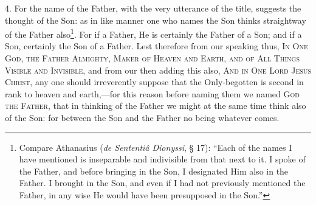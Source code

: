4. For the name of the Father, with the very utterance of the title, suggests the thought of the Son: as in like manner one who names the Son thinks straightway of the Father also\footnote{Compare Athanasius (\emph{de Sententiâ Dionyssi}, § 17): “Each of the names I have mentioned is inseparable and indivisible from that next to it. I spoke of the Father, and before bringing in the Son, I designated Him also in the Father. I brought in the Son, and even if I had not previously mentioned the Father, in any wise He would have been presupposed in the Son.”}. For if a Father, He is certainly the Father of a Son; and if a Son, certainly the Son of a Father. Lest therefore from our speaking thus, \textsc{In One God, the Father Almighty, Maker of Heaven and Earth, and of All Things Visible and Invisible}, and from our then adding this also, \textsc{And in One Lord Jesus Christ}, any one should irreverently suppose that the Only-begotten is second in rank to heaven and earth,—for this reason before naming them we named \textsc{God the Father}, that in thinking of the Father we might at the same time think also of the Son: for between the Son and the Father no being whatever comes.

